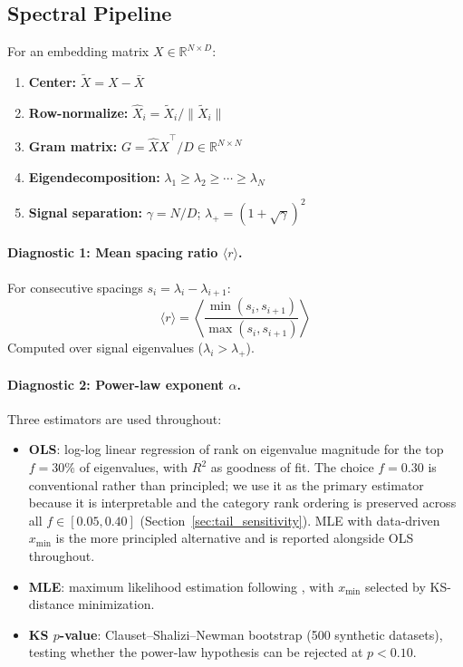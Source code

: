 \documentclass[12pt,letterpaper]{article}
\newcommand{\rbar}{\langle r \rangle}
\newcommand{\al}{\alpha}
\newcommand{\mpedge}{\lambda_+}
\begin{document}
\subsection{Spectral Pipeline}
\label{sec:pipeline}

For an embedding matrix $X \in \mathbb{R}^{N \times D}$:

\begin{enumerate}
\item \textbf{Center:} $\tilde{X} = X - \bar{X}$
\item \textbf{Row-normalize:} $\hat{X}_i = \tilde{X}_i / \|\tilde{X}_i\|$
\item \textbf{Gram matrix:} $G = \hat{X}\hat{X}^\top / D \in \mathbb{R}^{N \times N}$
\item \textbf{Eigendecomposition:} $\lambda_1 \geq \lambda_2 \geq \cdots \geq \lambda_N$
\item \textbf{Signal separation:} $\gamma = N/D$; \quad $\mpedge = (1 + \sqrt{\gamma})^2$
\end{enumerate}

\paragraph{Diagnostic 1: Mean spacing ratio $\rbar$.}
For consecutive spacings $s_i = \lambda_i - \lambda_{i+1}$:
\[
\rbar = \left\langle \frac{\min(s_i, s_{i+1})}{\max(s_i, s_{i+1})} \right\rangle
\]
Computed over signal eigenvalues ($\lambda_i > \mpedge$).

\paragraph{Diagnostic 2: Power-law exponent $\al$.}
Three estimators are used throughout:

\begin{itemize}
\item \textbf{OLS}: log-log linear regression of rank on eigenvalue
magnitude for the top $f = 30\%$ of eigenvalues, with $R^2$ as
goodness of fit.  The choice $f = 0.30$ is conventional rather than
principled; we use it as the primary estimator because it is
interpretable and the category rank ordering is preserved across
all $f \in [0.05, 0.40]$ (Section~\ref{sec:tail_sensitivity}).
MLE with data-driven $x_{\min}$ is the more principled alternative
and is reported alongside OLS throughout.
\item \textbf{MLE}: maximum likelihood estimation following
\citet{clauset2009}, with $x_{\min}$ selected by KS-distance
minimization.
\item \textbf{KS $p$-value}: Clauset--Shalizi--Newman bootstrap
(500 synthetic datasets), testing whether the power-law hypothesis
can be rejected at $p < 0.10$.
\end{itemize}
\end{document}
